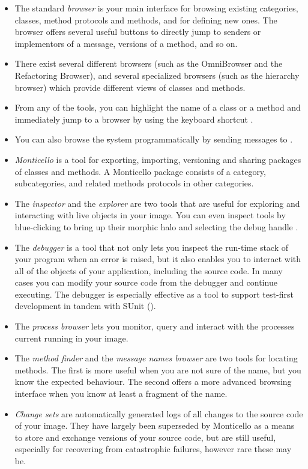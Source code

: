 \documentclass[a4paper,10pt,twoside]{book}
\begin{document}
\begin{itemize}
  \item The standard \emph{browser} is your main interface for browsing existing categories, classes, method protocols and methods, and for defining new ones.
  The browser offers several useful buttons to directly jump to senders or implementors of a message, versions of a method, and so on.
  \item There exist several different browsers (such as the OmniBrowser and the Refactoring Browser), and several specialized browsers (such as the hierarchy browser) which provide different views of classes and methods.
  \item From any of the tools, you can highlight the name of a class or a method and immediately jump to a browser by using the keyboard shortcut .
  \item You can also browse the \st system programmatically by sending messages to .
  \item \emph{Monticello} is a tool for exporting, importing, versioning and sharing packages of classes and methods.
  A Monticello package consists of a category, subcategories, and related methods protocols in other categories.
  \item The \emph{inspector} and the \emph{explorer} are two tools that are useful for exploring and interacting with live objects in your image.
  You can even inspect tools by blue-clicking to bring up their morphic halo and selecting the debug handle \debugHandle.
  \item The \emph{debugger} is a tool that not only lets you inspect the run-time stack of your program when an error is raised, but it also enables you to interact with all of the objects of your application, including the source code. In many cases you can modify your source code from the debugger and continue executing. The debugger is especially effective as a tool to support test-first development in tandem with SUnit ().
  \item The \emph{process browser} lets you monitor, query and interact with the processes current running in your image.
  \item The \emph{method finder} and the \emph{message names browser} are two tools for locating methods. The first is more useful when you are not sure of the name, but you know the expected behaviour. The second offers a more advanced browsing interface when you know at least a fragment of the name.
  \item \emph{Change sets} are automatically generated logs of all changes to the source code of your image. They have largely been superseded by Monticello as a means to store and exchange versions of your source code, but are still useful, especially for recovering from catastrophic failures, however rare these may be.

\end{itemize}
\end{document}

